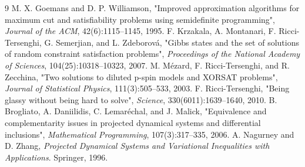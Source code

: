 \documentclass[11pt,a4paper]{article}
\begin{document}
\begin{thebibliography}{9}
 M. X. Goemans and D. P. Williamson, "Improved approximation algorithms for maximum cut and satisfiability problems using semidefinite programming", \emph{Journal of the ACM}, 42(6):1115--1145, 1995.
 F. Krzakala, A. Montanari, F. Ricci-Tersenghi, G. Semerjian, and L. Zdeborov\'a, "Gibbs states and the set of solutions of random constraint satisfaction problems", \emph{Proceedings of the National Academy of Sciences}, 104(25):10318--10323, 2007.
 M. M\'ezard, F. Ricci-Tersenghi, and R. Zecchina, "Two solutions to diluted p-spin models and XORSAT problems", \emph{Journal of Statistical Physics}, 111(3):505--533, 2003.
 F. Ricci-Tersenghi, "Being glassy without being hard to solve", \emph{Science}, 330(6011):1639--1640, 2010.
 B. Brogliato, A. Daniilidis, C. Lemar\'echal, and J. Malick, "Equivalence and complementarity issues in projected dynamical systems and differential inclusions", \emph{Mathematical Programming}, 107(3):317--335, 2006.
 A. Nagurney and D. Zhang, \emph{Projected Dynamical Systems and Variational Inequalities with Applications}. Springer, 1996.
\end{thebibliography}
\end{document}
